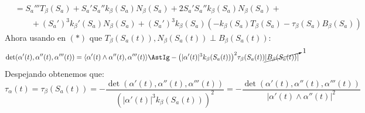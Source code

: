 \begin{ejercicio}
\begin{align*}
                  &= S_a'''T_\beta(S_a) + S_a'S_a''k_\beta(S_a)N_\beta(S_a) + 2S_a'S_a''k_\beta(S_a)N_\beta(S_a) + \\
                  &\qquad + {(S_a')}^{3}k_\beta'(S_a)N_\beta(S_a) + {(S_a')}^{3}k_\beta(S_a)(-k_\beta(S_a)T_\beta(S_a) - \tau_\beta(S_a)B_\beta(S_a))
    \end{align*}
    Ahora usando en $(\ast)$ que $T_\beta(S_a(t)),N_\beta(S_a(t))\perp B_\beta(S_a(t))$:
    \begin{equation*}
        \det(\alpha'(t),\alpha''(t),\alpha'''(t)) = \langle \alpha'(t)\land \alpha''(t),\alpha'''(t) \rangle \AstIg - {\left(|\alpha'(t)|^3 k_\beta(S_a(t))\right)}^{2} \tau_\beta(S_a(t)) \cancelto{1}{|B_\beta(S_a(t))|}
    \end{equation*}
    Despejando obtenemos que:
    \begin{equation*}
        \tau_\alpha(t) = \tau_\beta(S_a(t)) = -\frac{\det(\alpha'(t), \alpha''(t), \alpha'''(t))}{{\left(|\alpha'(t)|^3k_\beta(S_a(t))\right)}^{2}} = -\frac{\det(\alpha'(t),\alpha''(t),\alpha'''(t))}{|\alpha'(t)\land\alpha''(t)|^2}
    \end{equation*}
\end{ejercicio}

